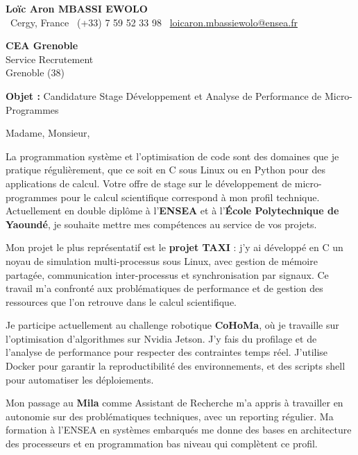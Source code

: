 \documentclass[a4paper,11pt]{article}
\begin{document}
\begin{center}
    {\Large \textbf{Loïc Aron MBASSI EWOLO}}\\[4pt]
    \small
    \faMapMarker\ Cergy, France \quad
    \faPhone\ (+33) 7 59 52 33 98 \quad
    \faEnvelope\ \href{mailto:loicaron.mbassiewolo@ensea.fr}{loicaron.mbassiewolo@ensea.fr}
\end{center}
\vspace{0.5cm}

\hfill
\begin{minipage}[t]{0.45\textwidth}
    \textbf{CEA Grenoble}\\
    Service Recrutement\\
    Grenoble (38)
\end{minipage}

\vspace{1cm}

\textbf{Objet :} Candidature Stage Développement et Analyse de Performance de Micro-Programmes

\vspace{0.5cm}

Madame, Monsieur,

La programmation système et l'optimisation de code sont des domaines que je pratique régulièrement, que ce soit en C sous Linux ou en Python pour des applications de calcul. Votre offre de stage sur le développement de micro-programmes pour le calcul scientifique correspond à mon profil technique. Actuellement en double diplôme à l'\textbf{ENSEA} et à l'\textbf{École Polytechnique de Yaoundé}, je souhaite mettre mes compétences au service de vos projets.

Mon projet le plus représentatif est le \textbf{projet TAXI} : j'y ai développé en C un noyau de simulation multi-processus sous Linux, avec gestion de mémoire partagée, communication inter-processus et synchronisation par signaux. Ce travail m'a confronté aux problématiques de performance et de gestion des ressources que l'on retrouve dans le calcul scientifique.

Je participe actuellement au challenge robotique \textbf{CoHoMa}, où je travaille sur l'optimisation d'algorithmes sur Nvidia Jetson. J'y fais du profilage et de l'analyse de performance pour respecter des contraintes temps réel. J'utilise Docker pour garantir la reproductibilité des environnements, et des scripts shell pour automatiser les déploiements.

Mon passage au \textbf{Mila} comme Assistant de Recherche m'a appris à travailler en autonomie sur des problématiques techniques, avec un reporting régulier. Ma formation à l'ENSEA en systèmes embarqués me donne des bases en architecture des processeurs et en programmation bas niveau qui complètent ce profil.
\end{document}
